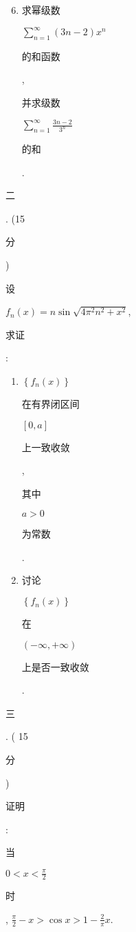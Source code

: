 \documentclass[10pt]{article}
\begin{document}
\begin{enumerate}
  \setcounter{enumi}{5}
  \item \begin{CJK}{UTF8}{mj}求幂级数\end{CJK} $\sum_{n=1}^{\infty}(3 n-2) x^{n}$ \begin{CJK}{UTF8}{mj}的和函数\end{CJK}, \begin{CJK}{UTF8}{mj}并求级数\end{CJK} $\sum_{n=1}^{\infty} \frac{3 n-2}{3^{n}}$ \begin{CJK}{UTF8}{mj}的和\end{CJK}.
\end{enumerate}
\begin{CJK}{UTF8}{mj}二\end{CJK}. (15 \begin{CJK}{UTF8}{mj}分\end{CJK}) \begin{CJK}{UTF8}{mj}设\end{CJK} $f_{n}(x)=n \sin \sqrt{4 \pi^{2} n^{2}+x^{2}}$, \begin{CJK}{UTF8}{mj}求证\end{CJK}:

\begin{enumerate}
  \item $\left\{f_{n}(x)\right\}$ \begin{CJK}{UTF8}{mj}在有界闭区间\end{CJK} $[0, a]$ \begin{CJK}{UTF8}{mj}上一致收敛\end{CJK}, \begin{CJK}{UTF8}{mj}其中\end{CJK} $a>0$ \begin{CJK}{UTF8}{mj}为常数\end{CJK}.

  \item \begin{CJK}{UTF8}{mj}讨论\end{CJK} $\left\{f_{n}(x)\right\}$ \begin{CJK}{UTF8}{mj}在\end{CJK} $(-\infty,+\infty)$ \begin{CJK}{UTF8}{mj}上是否一致收敛\end{CJK}.

\end{enumerate}
\begin{CJK}{UTF8}{mj}三\end{CJK}. ( 15 \begin{CJK}{UTF8}{mj}分\end{CJK}) \begin{CJK}{UTF8}{mj}证明\end{CJK}: \begin{CJK}{UTF8}{mj}当\end{CJK} $0<x<\frac{\pi}{2}$ \begin{CJK}{UTF8}{mj}时\end{CJK}, $\frac{\pi}{2}-x>\cos x>1-\frac{2}{\pi} x$.
\end{document}
